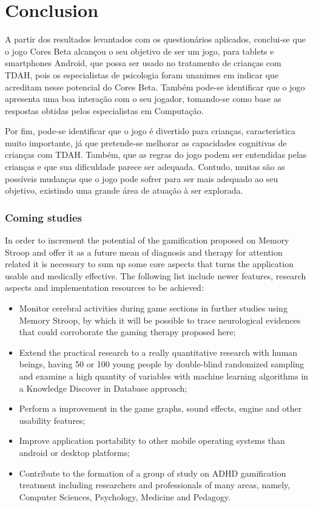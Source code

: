 \chapter{Conclusion}
\label{ch:conclusion}

A partir dos resultados levantados com os question\'{a}rios aplicados, conclui-se que o jogo Cores Beta alcan\c{c}ou o seu objetivo de ser um jogo, para tablets e smartphones Android, que possa ser usado no tratamento de crian\c{c}as com TDAH, pois os especialistas de psicologia foram unanimes em indicar que acreditam nesse potencial do Cores Beta. Tamb\'em pode-se identificar que o jogo apresenta uma boa intera\c{c}\~{a}o com o seu jogador, tomando-se como base as respostas obtidas pelos especialistas em Computa\c{c}\~{a}o.

Por fim, pode-se identificar que o jogo \'e divertido para crian\c{c}as, caracteristica muito importante, j\'{a} que pretende-se melhorar as capacidades cognitivas de crian\c{c}as com TDAH. Tamb\'em, que as regras do jogo podem ser entendidas pelas crian\c{c}as e que sua dificuldade parece ser adequada. Contudo, muitas s\~{a}o as poss\'{i}veis mudan\c{c}as que o jogo pode sofrer para ser mais adequado ao seu objetivo, existindo uma grande \'{a}rea de atua\c{c}\~{a}o \`{a} ser explorada.

\subsection{Coming studies}

In order to increment the potential of the gamification proposed on Memory Stroop and offer it as a future mean of diagnosis and therapy for attention related it is necessary to sum up some core aspects that turns the application usable and medically effective. The following list include newer features, research aspects and implementation resources to be achieved:

\begin{itemize}
\item Monitor cerebral activities during game sections in further studies using Memory Stroop, by which it will be possible to trace neurological evidences that could corroborate the gaming therapy proposed here;
\item Extend the practical research to a really quantitative research with human beings, having 50 or 100 young people by double-blind randomized sampling and examine a high quantity of variables with machine learning algorithms in a Knowledge Discover in Database approach;
\item Perform a improvement in the game graphs, sound effects, engine and other usability features;
\item Improve application portability to other mobile operating systems than android or desktop platforms;
\item Contribute to the formation of a group of study on ADHD gamification treatment including researchers and professionals of many areas, namely, Computer Sciences, Psychology, Medicine and Pedagogy.


\end{itemize}
